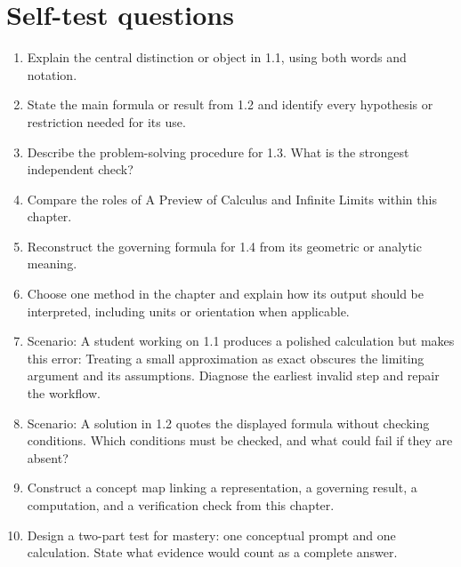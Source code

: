 \documentclass[11pt]{article}
\begin{document}
\section{Self-test questions}
\begin{enumerate}
\item Explain the central distinction or object in 1.1, using both words and notation.
\item State the main formula or result from 1.2 and identify every hypothesis or restriction needed for its use.
\item Describe the problem-solving procedure for 1.3. What is the strongest independent check?
\item Compare the roles of A Preview of Calculus and Infinite Limits within this chapter.
\item Reconstruct the governing formula for 1.4 from its geometric or analytic meaning.
\item Choose one method in the chapter and explain how its output should be interpreted, including units or orientation when applicable.
\item Scenario: A student working on 1.1 produces a polished calculation but makes this error: Treating a small approximation as exact obscures the limiting argument and its assumptions. Diagnose the earliest invalid step and repair the workflow.
\item Scenario: A solution in 1.2 quotes the displayed formula without checking conditions. Which conditions must be checked, and what could fail if they are absent?
\item Construct a concept map linking a representation, a governing result, a computation, and a verification check from this chapter.
\item Design a two-part test for mastery: one conceptual prompt and one calculation. State what evidence would count as a complete answer.
\end{enumerate}

\end{document}
